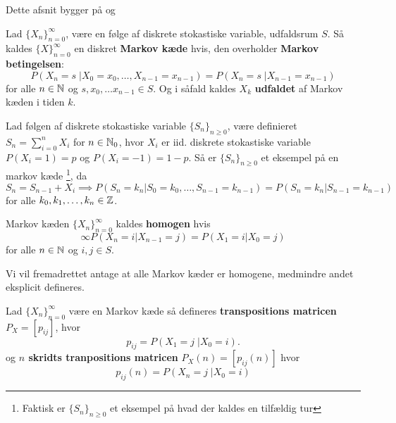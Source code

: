 Dette afsnit bygger på \cite{sandsynlighedsBog} og \cite{grimsandsynlighedsBog}
\begin{defn}
Lad $\{X_n\}_{n = 0}^\infty$, være en følge af diskrete stokastiske variable, udfaldsrum $S$. Så kaldes $\{X\}_{n = 0}^\infty$ en diskret \textbf{Markov kæde} hvis, den overholder \textbf{Markov betingelsen}:
\begin{equation*}
    P(X_n = s \;| X_0 = x_0, \ldots, X_{n - 1} = x_{n - 1}) = P(X_n = s \;| X_{n - 1} = x_{n - 1})
\end{equation*}
for alle $n \in \mathbb{N}$ og $s, x_0, \ldots x_{n - 1} \in S$. Og i såfald kaldes $X_k$ \textbf{udfaldet} af Markov kæden i tiden $k$.
\end{defn}
\begin{exmp} Lad følgen af diskrete stokastiske variable $\{S_{n}\}_{n \geq 0}$, være definieret $S_{n} = \sum_{i=0}^n X_{i}$ for $n \in \mathbb{N}_{0}$, hvor $X_{i}$ er iid. diskrete stokastiske variable $P(X_{i} = 1) = p$ og $P(X_{i} = -1) = 1 - p$. Så er $\{S_{n}\}_{n \geq 0}$ et eksempel på en markov kæde \footnote{Faktisk er $\{S_{n}\}_{n \geq 0}$ et eksempel på hvad der kaldes en tilfældig tur}, da
  \begin{equation*}
    S_{n} = S_{n - 1} + X_{i} \implies P(S_{n} = k_{n} | S_{0} = k_{0}, \ldots, S_{n - 1} = k_{n - 1}) = P(S_{n} = k_{n} | S_{n - 1} = k_{n - 1})
  \end{equation*}
  for alle $k_{0}, k_{1}, \ldots, k_{n} \in \mathbb{Z}$.
\end{exmp}
\begin{defn}
Markov kæden $\{X_n\}_{n = 0}^{\infty}$ kaldes \textbf{homogen} hvis
\begin{equation*}
  \infty
    P(X_n = i | X_{n - 1} = j) = P(X_1 = i | X_0 = j)
\end{equation*}
for alle $n \in \mathbb{N}$ og $i, j \in S$.
\end{defn}
Vi vil fremadrettet antage at alle Markov kæder er homogene, medmindre andet eksplicit defineres.
\begin{defn}
Lad $\{X_n\}_{n = 0}^\infty$ være en Markov kæde så defineres \textbf{transpositions matricen} $P_X = [p_{ij}]$, hvor 
\begin{equation*}
    p_{ij} = P(X_1 = j \;| X_0 = i).
\end{equation*}
og \textbf{$n$ skridts tranpositions matricen} $P_X(n) = [p_{ij}(n)]$ hvor
\begin{equation*}
    p_{ij}(n) = P(X_n = j \;| X_0 = i)
\end{equation*}
\end{defn}

